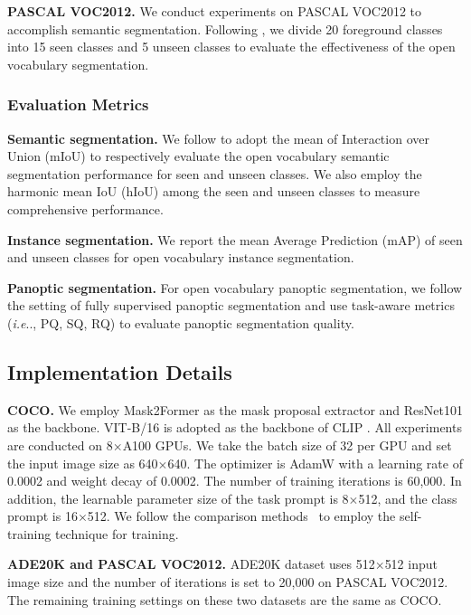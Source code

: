 \documentclass[10pt,twocolumn,letterpaper]{article}
\makeatletter
\DeclareRobustCommand\onedot{\futurelet\@let@token\@onedot}
\def\@onedot{\ifx\@let@token.\else.\null\fi\xspace}
\def\ie{\emph{i.e}\onedot} \def\Ie{\emph{I.e}\onedot}
\makeatother
\begin{document}
\noindent \textbf{PASCAL VOC2012.} We conduct experiments on PASCAL VOC2012\cite{everingham2012pascal} to accomplish semantic segmentation.
Following \cite{xian2019semantic, xu2021simple}, we divide 20 foreground classes into 15 seen classes and 5 unseen classes to evaluate the effectiveness of the open vocabulary segmentation.



\subsubsection{Evaluation Metrics}
\textbf{Semantic segmentation.}
We follow \cite{ding2022decoupling, xu2021simple} to adopt the mean of Interaction over Union (mIoU) to respectively evaluate the open vocabulary semantic segmentation performance for seen and unseen classes. We also employ the harmonic mean IoU (hIoU) among the seen and unseen classes to measure comprehensive performance. 

\noindent \textbf{Instance segmentation.}
We report the mean Average Prediction (mAP) of seen and unseen classes for open vocabulary instance segmentation. 


\noindent \textbf{Panoptic segmentation.}
For open vocabulary panoptic segmentation, we follow the setting of fully supervised panoptic segmentation and use task-aware metrics (\ie, PQ, SQ, RQ) to evaluate panoptic segmentation quality.



\subsection{Implementation Details}

\noindent \textbf{COCO.}
We employ Mask2Former\cite{cheng2022masked} as the mask proposal extractor and ResNet101 as the backbone. VIT-B/16 is adopted as the backbone of CLIP \cite{radford2021learning}.  All experiments are conducted on 8$\times$A100 GPUs. 
We take the batch size of 32 per GPU and set the input image size as 640$\times$640. 
The optimizer is AdamW with a learning rate of 0.0002 and weight decay of 0.0002. The number of training iterations is 60,000. 
In addition, the learnable parameter size of the task prompt is 8$\times$512, and the class prompt is 16$\times$512. 
We follow the comparison methods~\cite{pastore2021closer,ding2022decoupling,xu2021simple} to employ the self-training technique for training.

\noindent \textbf{ADE20K and PASCAL VOC2012.}
ADE20K dataset uses  512$\times$512 input image size and the number of iterations is set to 20,000 on PASCAL VOC2012. The remaining training settings on these two datasets are the same as COCO.
\end{document}
